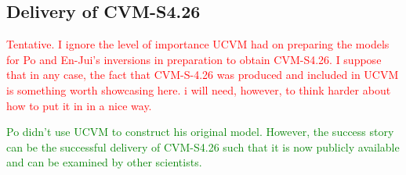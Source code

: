 

\subsection{Delivery of CVM-S4.26}

\textcolor{red}{Tentative. I ignore the level of importance UCVM had on preparing the models for Po and En-Jui's inversions in preparation to obtain CVM-S4.26. I suppose that in any case, the fact that CVM-S-4.26 was produced and included in UCVM is something worth showcasing here. i will need, however, to think harder about how to put it in in a nice way.}

\textcolor{green}{Po didn't use UCVM to construct his original model. However, the success story can be the successful delivery of CVM-S4.26 such that it is now publicly available and can be examined by other scientists.}
